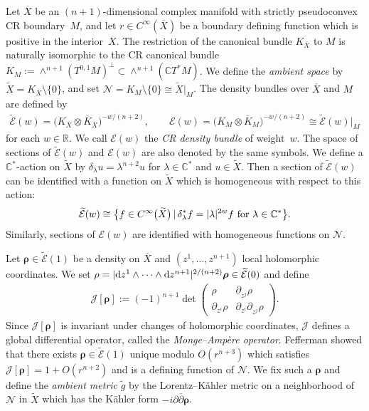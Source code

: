 \documentclass[pdftex]{sigma}
\numberwithin{equation}{section}
\begin{document}
Let $\overline X$ be an $(n+1)$-dimensional complex manifold with strictly pseudoconvex CR boundary~$M$, and let $r\in C^\infty(\overline{X})$ be a boundary def\/ining function which is positive in the interior~$X$. The restriction of the canonical bundle $K_{\overline X}$ to $M$ is naturally isomorphic to the CR canonical bundle $K_M:=\wedge^{n+1}(T^{0, 1}M)^\perp
\subset\wedge^{n+1}(\mathbb{C} T^\ast M)$. We def\/ine the {\it ambient space} by $\widetilde X=K_{\overline X}\setminus\{0\}$, and set
$\mathcal{N}=K_M\setminus\{0\}\cong\widetilde X|_M$. The density bundles over $\overline X$ and $M$ are def\/ined by
\begin{gather*}
\widetilde{\mathcal{E}}(w)=\big(K_{\overline X}\otimes\overline{K}_{\overline X}\big)^{-w/(n+2)}, \qquad
\mathcal{E}(w)=\big(K_M\otimes\overline{K}_M\big)^{-w/(n+2)}\cong\widetilde{\mathcal{E}}(w)|_M
\end{gather*}
for each $w\in\mathbb{R}$. We call $\mathcal{E}(w)$ the {\it CR density bundle} of weight~$w$. The space of sections of $\widetilde{\mathcal{E}}(w)$ and $\mathcal{E}(w)$ are also denoted by the same symbols. We def\/ine a $\mathbb{C}^\ast$-action on $\widetilde X$ by $\delta_\lambda u=
\lambda^{n+2}u$ for $\lambda\in\mathbb{C}^\ast$ and $u\in\widetilde X$. Then a section of $\widetilde{\mathcal{E}}(w)$ can be identif\/ied with a function on $\widetilde X$ which is homogeneous with respect to this action:
\begin{gather*}
\widetilde{\mathcal{E}}(w)\cong \big\{f\in C^\infty\big(\widetilde X\big)\, |\, \delta_\lambda^\ast f=|\lambda|^{2w}f\ {\rm for}\ \lambda\in\mathbb{C}^\ast\big\}.
\end{gather*}
Similarly, sections of $\mathcal{E}(w)$ are identif\/ied with homogeneous functions on $\mathcal{N}$.

Let $\boldsymbol\rho\in\widetilde{\mathcal{E}}(1)$ be a density on $\overline X$ and $(z^1, \dots, z^{n+1})$ local holomorphic coordinates. We set $\rho=|{\rm d}z^1\wedge\cdots\wedge {\rm d}z^{n+1}|^{2/(n+2)}\boldsymbol\rho\in\widetilde{\mathcal{E}}(0)$ and def\/ine
\begin{gather*}
\mathcal{J}[\boldsymbol\rho]:=(-1)^{n+1}\det
\begin{pmatrix}
\rho & \partial_{z^{\overline j}}\rho \\
\partial_{z^i}\rho & \partial_{z^i}\partial_{z^{\overline j}}\rho
\end{pmatrix}.
\end{gather*}
Since $\mathcal{J}[\boldsymbol\rho]$ is invariant under changes of holomorphic coordinates, $\mathcal{J}$ def\/ines a global dif\/ferential operator, called the {\it Monge--Amp\`ere operator}. Fef\/ferman \cite{Fefferman} showed that there exists $\boldsymbol\rho\in\widetilde{\mathcal{E}}(1)$ unique modulo
$O(r^{n+3})$ which satisf\/ies $\mathcal{J}[\boldsymbol\rho]=1+O(r^{n+2})$ and is a def\/ining function of $\mathcal{N}$.
We f\/ix such a $\boldsymbol\rho$ and def\/ine the {\it ambient metric} $\widetilde g$ by the Lorentz--K\"ahler metric on a neighborhood of $\mathcal{N}$ in $\widetilde X$ which has the K\"ahler form $-i\partial\overline{\partial}\boldsymbol\rho$.
\end{document}
